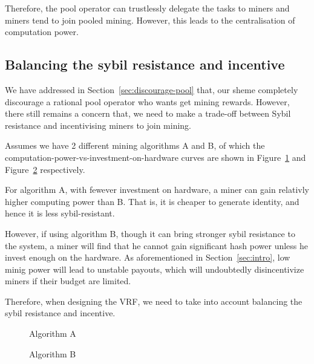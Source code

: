 Therefore, the pool operator can trustlessly delegate the tasks to miners and miners tend to join pooled mining.
However, this leads to the centralisation of computation power.

\subsection{Balancing the sybil resistance and incentive}

We have addressed in Section~\ref{sec:discourage-pool} that, our sheme completely discourage a rational pool operator who wants get mining rewards.
However, there still remains a concern that, we need to make a trade-off between Sybil resistance and incentivising miners to join mining.


Assumes we have 2 different mining algorithms A and B, of which the computation-power-vs-investment-on-hardware curves are shown in Figure~\ref{fig:algo_A} and Figure~\ref{fig:algo_B} respectively.

For algorithm A, with fewever investment on hardware, a miner can gain relativly higher computing power than B. That is, it is cheaper to generate identity, and hence it is less sybil-resistant.

However, if using algorithm B, though it can bring stronger sybil resistance to the system, a miner will find that he cannot gain significant hash power unless he invest enough on the hardware.
As aforementioned in Section~\ref{sec:intro}, low minig power will lead to unstable payouts, which will undoubtedly disincentivize miners if their budget are limited.

Therefore, when designing the VRF, we need to take into account balancing the sybil resistance and incentive.

\begin{figure}
\centering
{}
\caption{Algorithm A}
\label{fig:algo_A}
\end{figure}


\begin{figure}
\centering
{}
\caption{Algorithm B}
\label{fig:algo_B}
\end{figure}
